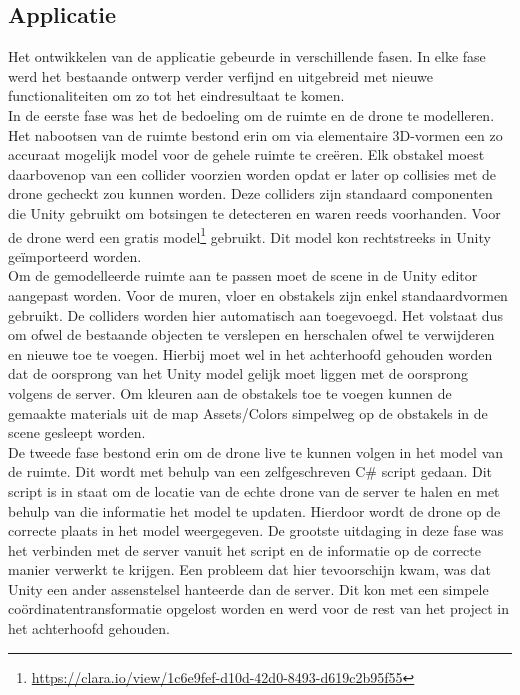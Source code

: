 \subsection{Applicatie} \label{sec:unity}
Het ontwikkelen van de applicatie gebeurde in verschillende fasen. In elke fase werd het bestaande ontwerp verder verfijnd en uitgebreid met nieuwe functionaliteiten om zo tot het eindresultaat te komen.\\

In de eerste fase was het de bedoeling om de ruimte en de drone te modelleren. Het nabootsen van de ruimte bestond erin om via elementaire 3D-vormen een zo accuraat mogelijk model voor de gehele ruimte te cre\"eren. Elk obstakel moest daarbovenop van een collider voorzien worden opdat er later op collisies met de drone gecheckt zou kunnen worden. Deze colliders zijn standaard componenten die Unity gebruikt om botsingen te detecteren en waren reeds voorhanden. Voor de drone werd een gratis model\footnote{\url{https://clara.io/view/1c6e9fef-d10d-42d0-8493-d619c2b95f55}} gebruikt. Dit model kon rechtstreeks in Unity ge\"importeerd worden. \\

Om de gemodelleerde ruimte aan te passen moet de scene in de Unity editor aangepast worden. Voor de muren, vloer en obstakels zijn enkel standaardvormen gebruikt. De colliders worden hier automatisch aan toegevoegd. Het volstaat dus om ofwel de bestaande objecten te verslepen en herschalen ofwel te verwijderen en nieuwe toe te voegen. Hierbij moet wel in het achterhoofd gehouden worden dat de oorsprong van het Unity model gelijk moet liggen met de oorsprong volgens de server. Om kleuren aan de obstakels toe te voegen kunnen de gemaakte materials uit de map Assets/Colors simpelweg op de obstakels in de scene gesleept worden.\\

De tweede fase bestond erin om de drone live te kunnen volgen in het model van de ruimte. Dit wordt met behulp van een zelfgeschreven C\# script gedaan. Dit script is in staat om de locatie van de echte drone van de server te halen en met behulp van die informatie het model te updaten. Hierdoor wordt de drone op de correcte plaats in het model weergegeven. De grootste uitdaging in deze fase was het verbinden met de server vanuit het script en de informatie op de correcte manier verwerkt te krijgen. Een probleem dat hier tevoorschijn kwam, was dat Unity een ander assenstelsel hanteerde dan de server. Dit kon met een simpele co\"ordinatentransformatie opgelost worden en werd voor de rest van het project in het achterhoofd gehouden.\\

